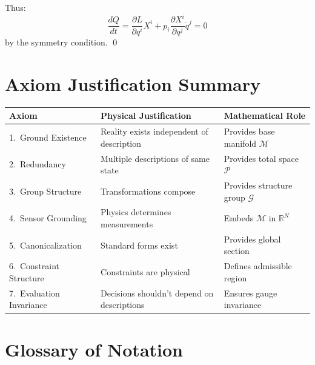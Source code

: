 \documentclass[11pt]{article}
\begin{document}
Thus:
\[
\frac{dQ}{dt} = \frac{\partial L}{\partial q^i} X^i + p_i \frac{\partial X^i}{\partial q^j}\dot{q}^j = 0
\]
by the symmetry condition.
\qed

\section{Axiom Justification Summary}

\begin{table}[h]
\centering
\begin{tabular}{@{}p{2.5cm}p{4.5cm}p{4.5cm}@{}}
\toprule
\textbf{Axiom} & \textbf{Physical Justification} & \textbf{Mathematical Role} \\
\midrule
1.\ Ground Existence & Reality exists independent of description & Provides base manifold $\mathcal{M}$ \\
2.\ Redundancy & Multiple descriptions of same state & Provides total space $\mathcal{P}$ \\
3.\ Group Structure & Transformations compose & Provides structure group $\mathcal{G}$ \\
4.\ Sensor Grounding & Physics determines measurements & Embeds $\mathcal{M}$ in $\mathbb{R}^N$ \\
5.\ Canonicalization & Standard forms exist & Provides global section \\
6.\ Constraint Structure & Constraints are physical & Defines admissible region \\
7.\ Evaluation Invariance & Decisions shouldn't depend on descriptions & Ensures gauge invariance \\
\bottomrule
\end{tabular}
\end{table}

\section{Glossary of Notation}
\end{document}

